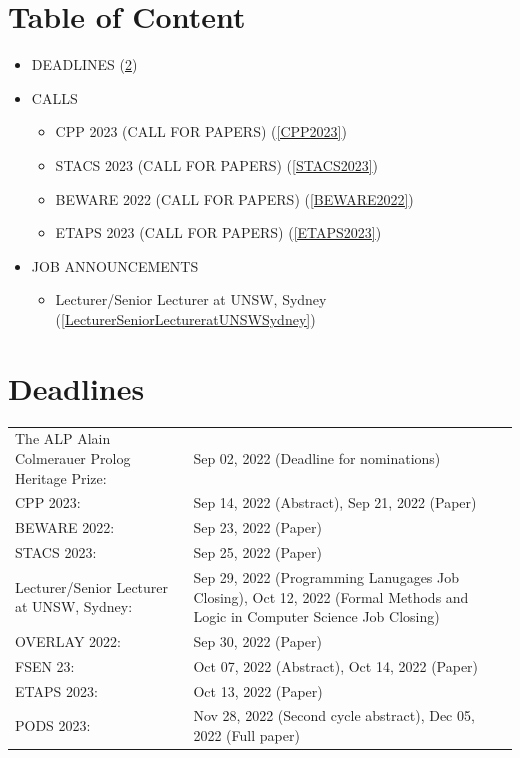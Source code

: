 \documentclass[prodmode,acmtecs]{acmsmall} %
\begin{document}
\section{Table of Content}\begin{itemize}\item DEADLINES (\cref{deadlines}) 
 
\item CALLS 
 
\begin{itemize}\item CPP 2023 (CALL FOR PAPERS) (\cref{CPP2023})
\item STACS 2023 (CALL FOR PAPERS) (\cref{STACS2023})
\item BEWARE 2022 (CALL FOR PAPERS) (\cref{BEWARE2022})
\item ETAPS 2023 (CALL FOR PAPERS) (\cref{ETAPS2023})
\end{itemize} 
\item JOB ANNOUNCEMENTS 
 
\begin{itemize}\item Lecturer/Senior Lecturer at UNSW, Sydney (\cref{LecturerSeniorLectureratUNSWSydney})
\end{itemize} 
\end{itemize}\section{Deadlines}\label{deadlines}\begin{tabulary}{\linewidth}{LL}The ALP Alain Colmerauer Prolog Heritage Prize:  & Sep 02, 2022 (Deadline for nominations) \\
CPP 2023:  & Sep 14, 2022 (Abstract), Sep 21, 2022 (Paper) \\
BEWARE 2022:  & Sep 23, 2022 (Paper) \\
STACS 2023:  & Sep 25, 2022 (Paper) \\
Lecturer/Senior Lecturer at UNSW, Sydney:  & Sep 29, 2022 (Programming Lanugages Job Closing), Oct 12, 2022 (Formal Methods and Logic in Computer Science Job Closing) \\
OVERLAY 2022:  & Sep 30, 2022 (Paper) \\
FSEN 23:  & Oct 07, 2022 (Abstract), Oct 14, 2022 (Paper) \\
ETAPS 2023:  & Oct 13, 2022 (Paper) \\
PODS 2023:  & Nov 28, 2022 (Second cycle abstract), Dec 05, 2022 (Full paper) \\
\end{tabulary}
\end{document}
